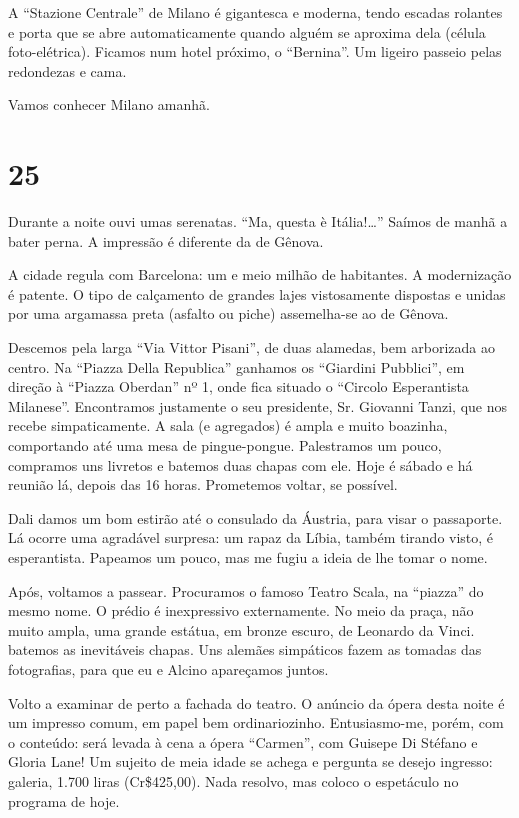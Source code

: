 A ``Stazione Centrale'' de Milano é gigantesca e moderna, tendo escadas rolantes e porta que se abre automaticamente quando alguém se aproxima dela (célula foto-elétrica). Ficamos num hotel próximo, o ``Bernina''. Um ligeiro passeio pelas redondezas e cama.

Vamos conhecer Milano amanhã.

\section*{25 \adfflatleafright {}}
Durante a noite ouvi umas serenatas. ``Ma, questa è Itália!\ldots'' Saímos de manhã a bater perna. A impressão é diferente da de Gênova.

A cidade regula com Barcelona: um e meio milhão de habitantes. A modernização é patente. O tipo de calçamento de grandes lajes vistosamente dispostas e unidas por uma argamassa preta (asfalto ou piche) assemelha-se ao de Gênova.

Descemos pela larga ``Via Vittor Pisani'', de duas alamedas, bem arborizada ao centro. Na ``Piazza Della Republica'' ganhamos os ``Giardini Pubblici'', em direção à ``Piazza Oberdan'' nº 1, onde fica situado o ``Circolo Esperantista Milanese''. Encontramos justamente o seu presidente, Sr. Giovanni Tanzi, que nos recebe simpaticamente. A sala (e agregados) é ampla e muito boazinha, comportando até uma mesa de pingue-pongue. Palestramos um pouco, compramos uns livretos e batemos duas chapas com ele. Hoje é sábado e há reunião lá, depois das 16 horas. Prometemos voltar, se possível.

Dali damos um bom estirão até o consulado da Áustria, para visar o passaporte. Lá ocorre uma agradável surpresa: um rapaz da Líbia, também tirando visto, é esperantista. Papeamos um pouco, mas me fugiu a ideia de lhe tomar o nome.

Após, voltamos a passear. Procuramos o famoso Teatro Scala, na ``piazza'' do mesmo nome. O prédio é inexpressivo externamente. No meio da praça, não muito ampla, uma grande estátua, em bronze escuro, de Leonardo da Vinci. batemos as inevitáveis chapas. Uns alemães simpáticos fazem as tomadas das fotografias, para que eu e Alcino apareçamos juntos.

Volto a examinar de perto a fachada do teatro. O anúncio da ópera desta noite é um impresso comum, em papel bem ordinariozinho. Entusiasmo-me, porém, com o conteúdo: será levada à cena a ópera ``Carmen'', com Guisepe Di Stéfano e Gloria Lane! Um sujeito de meia idade se achega e pergunta se desejo ingresso: galeria, 1.700 liras (Cr\$425,00). Nada resolvo, mas coloco o espetáculo no programa de hoje.

